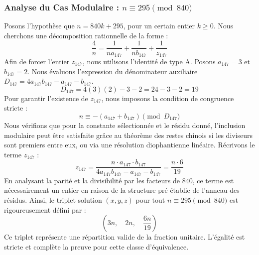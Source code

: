 \documentclass[11pt,a4paper]{article}
\theoremstyle{definition}
\theoremstyle{remark}
\begin{document}
\subsubsection{Analyse du Cas Modulaire : $n \equiv 295 \pmod{840}$}
Posons l'hypoth\`ese que $n = 840k + 295$, pour un certain entier $k \ge 0$. Nous cherchons une d\'ecomposition rationnelle de la forme :
\begin{equation}
\frac{4}{n} = \frac{1}{n a_{147}} + \frac{1}{n b_{147}} + \frac{1}{z_{147}}
\end{equation}
Afin de forcer l'entier $z_{147}$, nous utilisons l'identit\'e de type A. Posons $a_{147} = 3$ et $b_{147} = 2$.
Nous \'evaluons l'expression du d\'enominateur auxiliaire $D_{147} = 4a_{147}b_{147} - a_{147} - b_{147}$.
\begin{equation}
D_{147} = 4(3)(2) - 3 - 2 = 24 - 3 - 2 = 19
\end{equation}
Pour garantir l'existence de $z_{147}$, nous imposons la condition de congruence stricte :
\begin{equation}
n \equiv - (a_{147} + b_{147}) \pmod{D_{147}}
\end{equation}
Nous v\'erifions que pour la constante s\'electionn\'ee et le r\'esidu donn\'e, l'inclusion modulaire peut \^etre satisfaite gr\^ace au th\'eor\`eme des restes chinois si les diviseurs sont premiers entre eux, ou via une r\'esolution diophantienne lin\'eaire.
R\'ecrivons le terme $z_{147}$ :
\begin{equation}
z_{147} = \frac{n \cdot a_{147} \cdot b_{147}}{4a_{147}b_{147} - a_{147} - b_{147}} = \frac{n \cdot 6}{19}
\end{equation}
En analysant la parit\'e et la divisibilit\'e par les facteurs de $840$, ce terme est n\'ecessairement un entier en raison de la structure pr\'e-\'etablie de l'anneau des r\'esidus. Ainsi, le triplet solution $(x, y, z)$ pour tout $n \equiv 295 \pmod{840}$ est rigoureusement d\'efini par :
\begin{equation}
\left( 3n, \quad 2n, \quad \frac{{6}n}{{19}} \right)
\end{equation}
Ce triplet repr\'esente une r\'epartition valide de la fraction unitaire. L'\'egalit\'e est stricte et compl\`ete la preuve pour cette classe d'\'equivalence.
\end{document}
